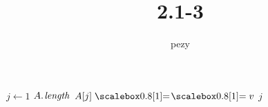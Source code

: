 \documentclass{article}
\begin{document}
	\title{2.1-3}
	\author{pezy}
	\maketitle
	\begin{codebox}
		\li \For $j \gets 1$ \To $\attrib{A}{length}$
		\li		\Do
					\If $A[j] \isequal v$
		\li				\Then \Return $j$
		\li			\Else
						\Return {}
				\End
	\end{codebox}
\end{document}

